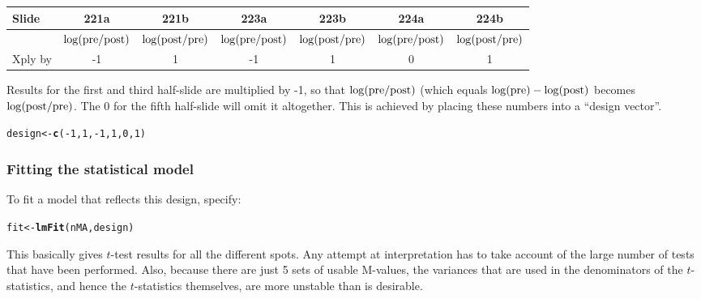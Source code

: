 \documentclass[a4paper,9pt]{article}\usepackage[]{graphicx}\usepackage[]{xcolor}
\makeatletter
\newcommand{\hlnum}[1]{\textcolor[rgb]{0.686,0.059,0.569}{#1}}%
\newcommand{\hlopt}[1]{\textcolor[rgb]{0,0,0}{#1}}%
\newcommand{\hlstd}[1]{\textcolor[rgb]{0.345,0.345,0.345}{#1}}%
\newcommand{\hlkwb}[1]{\textcolor[rgb]{0.69,0.353,0.396}{#1}}%
\newcommand{\hlkwd}[1]{\textcolor[rgb]{0.737,0.353,0.396}{\textbf{#1}}}%
\newenvironment{kframe}{%
 \def\at@end@of@kframe{}%
 \ifinner\ifhmode%
  \def\at@end@of@kframe{\end{minipage}}%
  \begin{minipage}{\columnwidth}%
 \fi\fi%
 \def\FrameCommand##1{\hskip\@totalleftmargin \hskip-\fboxsep
 \colorbox{shadecolor}{##1}\hskip-\fboxsep
     \hskip-\linewidth \hskip-\@totalleftmargin \hskip\columnwidth}%
 \MakeFramed {\advance\hsize-\width
   \@totalleftmargin\z@ \linewidth\hsize
   \@setminipage}}%
 {\par\unskip\endMakeFramed%
 \at@end@of@kframe}
\newenvironment{knitrout}{}{} %
\makeatother
\begin{document}
\begin{tabular}{lcccccc}
Slide & 221a & 221b & 223a & 223b & 224a & 224b \\
\hline
 & $\log({\rm pre/post)}$ & $\log({\rm post/pre)}$
 & $\log({\rm pre/post)}$ & $\log({\rm post/pre)}$
 & $\log({\rm pre/post)}$ & $\log({\rm post/pre)}$ \\
Xply by & -1 & 1 &  -1 & 1 &  0 & 1 \\
\hline
\end{tabular}
\vspace*{3pt}

Results for the first and third half-slide are multiplied by -1,
so that $\log({\rm pre/post)}$ (which equals
$\log({\rm pre}) - \log({\rm post)}$ becomes $\log({\rm post/pre)}$.
The 0 for the fifth half-slide will omit it altogether.
This is achieved by placing these numbers into a ``design vector''.
\begin{knitrout}
\color{fgcolor}\begin{kframe}
\begin{alltt}
\hlstd{design} \hlkwb{<-} \hlkwd{c}\hlstd{(}\hlopt{-}\hlnum{1}\hlstd{,} \hlnum{1}\hlstd{,} \hlopt{-}\hlnum{1}\hlstd{,} \hlnum{1}\hlstd{,} \hlnum{0}\hlstd{,} \hlnum{1}\hlstd{)}
\end{alltt}
\end{kframe}
\end{knitrout}

\subsubsection*{Fitting the statistical model}
To fit a model that reflects this design, specify:
\begin{knitrout}
\color{fgcolor}\begin{kframe}
\begin{alltt}
\hlstd{fit} \hlkwb{<-} \hlkwd{lmFit}\hlstd{(nMA, design)}
\end{alltt}
\end{kframe}
\end{knitrout}
This basically gives $t$-test results for all the different spots.
Any attempt at interpretation has to take account of the large number
of tests that have been performed.  Also, because there are just 5
sets of usable M-values, the variances that are used in the
denominators of the $t$-statistics, and hence the $t$-statistics
themselves, are more unstable than is desirable.
\end{document}
